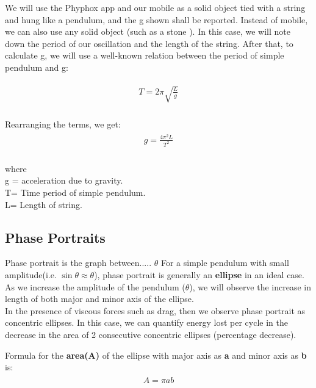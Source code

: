\documentclass[11pt]{scrartcl} %
\begin{document}
We will use the Phyphox app and our mobile as a solid object tied with a string and hung like a pendulum, and the g shown shall be reported. Instead of mobile, we can also use any solid object (such as a stone ). In this case, we will note down the period of our oscillation and the length of the string. After that, to calculate g, we will use a well-known relation between the period of simple pendulum and g: \par

\begin{align} 
	\begin{split}
		T = 2\pi\sqrt{\frac{L}{g}}\\
	\end{split}					
\end{align}

Rearranging the terms, we get:
\begin{align} 
	\begin{split}
		g = \frac{4\pi^2L}{T^2}\\
	\end{split}					
\end{align}

where\\ g = acceleration due to gravity.\\ T= Time period of simple pendulum.\\ L= Length of string. \par


\subsection{Phase Portraits}
Phase portrait is the graph between..... $\theta$ For a simple pendulum with small amplitude(i.e. $\sin\theta \approx \theta$), phase portrait is generally an \textbf{ellipse} in an ideal case. As we increase the amplitude of the pendulum ($\theta$), we will observe the increase in length of both major and minor axis of the ellipse. \\
In the presence of viscous forces such as drag, then we observe phase portrait as concentric ellipses. In this case, we can quantify energy lost per cycle in the decrease in the area of 2 consecutive concentric ellipses (percentage decrease).

Formula for the \textbf{area(A)} of the ellipse with major axis as \textbf{a} and minor axis as \textbf{b} is:
\begin{align} 
	\begin{split}
		A = \pi ab \nonumber\\
	\end{split}					
\end{align}
\end{document}
